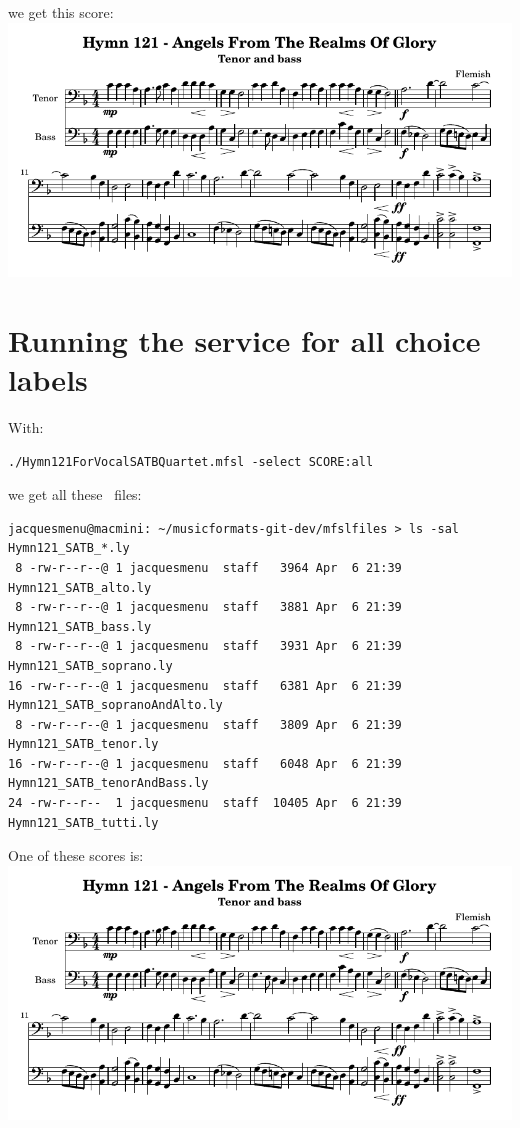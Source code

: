 we get this score:\\
\includegraphics[scale=0.8]{../mfgraphics/mfgraphicsHymn121_SATB_tenorAndBass.png}


\section{Running the service for all choice labels}

With:
\begin{lstlisting}[language=Terminal]
./Hymn121ForVocalSATBQuartet.mfsl -select SCORE:all
\end{lstlisting}

we get all these \lily\ files:
\begin{lstlisting}[language=TerminalSmall]
jacquesmenu@macmini: ~/musicformats-git-dev/mfslfiles > ls -sal Hymn121_SATB_*.ly
 8 -rw-r--r--@ 1 jacquesmenu  staff   3964 Apr  6 21:39 Hymn121_SATB_alto.ly
 8 -rw-r--r--@ 1 jacquesmenu  staff   3881 Apr  6 21:39 Hymn121_SATB_bass.ly
 8 -rw-r--r--@ 1 jacquesmenu  staff   3931 Apr  6 21:39 Hymn121_SATB_soprano.ly
16 -rw-r--r--@ 1 jacquesmenu  staff   6381 Apr  6 21:39 Hymn121_SATB_sopranoAndAlto.ly
 8 -rw-r--r--@ 1 jacquesmenu  staff   3809 Apr  6 21:39 Hymn121_SATB_tenor.ly
16 -rw-r--r--@ 1 jacquesmenu  staff   6048 Apr  6 21:39 Hymn121_SATB_tenorAndBass.ly
24 -rw-r--r--  1 jacquesmenu  staff  10405 Apr  6 21:39 Hymn121_SATB_tutti.ly
\end{lstlisting}

One of these scores is:\\
\includegraphics[scale=0.8]{../mfgraphics/mfgraphicsHymn121_SATB_tenorAndBass.png}


